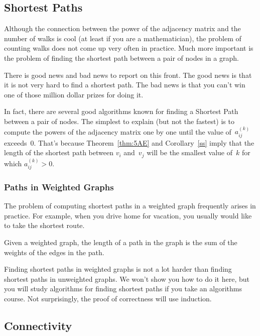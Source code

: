 \subsection{Shortest Paths}

Although the connection between the power of the adjacency matrix and
the number of walks is cool (at least if you are a mathematician), the
problem of counting walks does not come up very often in practice.
Much more important is the problem of finding the shortest path
between a pair of nodes in a graph.

There is good news and bad news to report on this front.  The good
news is that it is not very hard to find a shortest path.  The bad
news is that you can't win one of those million dollar prizes for
doing it.

In fact, there are several good algorithms known for finding a
Shortest Path between a pair of nodes.  The simplest to explain (but
not the fastest) is to compute the powers of the adjacency matrix one
by one until the value of~$a_{ij}^{(k)}$ exceeds~0.  That's because
Theorem~\ref{thm:5AE} and Corollary~\ref{ss} imply that the length of
the shortest path between $v_i$ and~$v_j$ will be the smallest value
of~$k$ for which $a_{ij}^{(k)} > 0$.

\subsubsection{Paths in Weighted Graphs}

The problem of computing shortest paths in a weighted graph frequently
arises in practice. For example, when you drive home for vacation, you
usually would like to take the shortest route.

\begin{definition}\label{def:5H}
Given a weighted graph, the length of a path in the graph is the sum
of the weights of the edges in the path.
\end{definition}

Finding shortest paths in weighted graphs is not a lot harder than
finding shortest paths in unweighted graphs.  We won't show you how to
do it here, but you will study algorithms for finding shortest paths
if you take an algorithms course.  Not surprisingly, the proof of
correctness will use induction.

\subsection{Connectivity}

